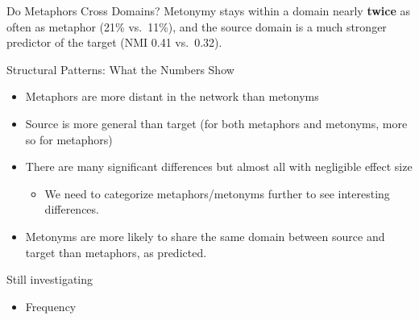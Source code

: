 \documentclass[xetex]{beamer}
\begin{document}
\begin{frame}{Do Metaphors Cross Domains?}
Metonymy stays within a domain nearly \textbf{twice} as often as metaphor (21\% vs.\ 11\%),
and the source domain is a much stronger predictor of the target (NMI 0.41 vs.\ 0.32).



\end{frame}




\begin{frame}{Structural Patterns: What the Numbers Show}
  \begin{itemize}
  \item Metaphors are more distant in the network than metonyms
  \item Source is more general than target (for both metaphors and metonyms, more so for metaphors) 
  \item There are many significant differences but almost all with negligible effect size
    \begin{itemize}
    \item We need to categorize metaphors/metonyms further to see interesting differences.
    \end{itemize}
  \item Metonyms are more likely to share the same domain between
    source and target than metaphors, as \citet{Kovecses2010Metaphor}
    predicted.
  \end{itemize}
  
Still investigating
  \begin{itemize}
  \item Frequency
  \end{itemize}
\end{frame}
\end{document}
